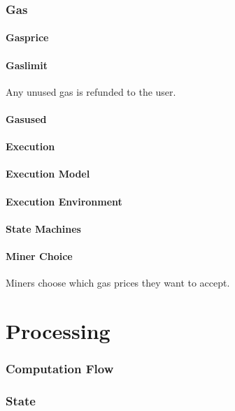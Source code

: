 \documentclass[11pt,a4paper,leqno,bibliography=totoc]{scrartcl}
\newenvironment{alphafootnotes}
{\par\edef\savedfootnotenumber{\number\value{footnote}}
\renewcommand{\thefootnote}{\alph{footnote}}
\setcounter{footnote}{0}}
{\par\setcounter{footnote}{\savedfootnotenumber}}
\begin{document}
\begin{alphafootnotes}
\begin{multicols*}{2}
\section{Gas}

\subsection{Gasprice}

\subsection{Gaslimit}
Any unused gas is refunded to the user.

\subsection{Gasused}

\subsection{Execution}

\subsection{Execution Model}

\subsection{Execution Environment}

\subsection{State Machines}

\subsection{Miner Choice}
Miners choose which gas prices they want to accept.


	\part{Processing}


\section{Computation Flow}

\section{State}

\end{multicols*}
\end{alphafootnotes}
\end{document}
